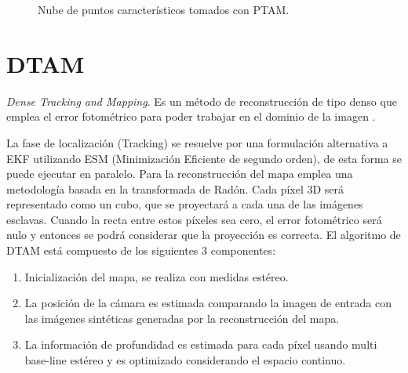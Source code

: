 \begin{figure}[H]
\begin{center}
\end{center}
\caption{Nube de puntos característicos tomados con PTAM.}
\end{figure}



\section{DTAM}
\textit {Dense Tracking and Mapping}. Es un método de reconstrucción de tipo denso que emplea el error fotométrico para poder trabajar en el dominio de la imagen 
\cite{Newcombe2011dtam}.

La fase de localización (Tracking) se resuelve por una formulación alternativa a EKF utilizando ESM (Minimización Eficiente de segundo orden), de esta forma se puede ejecutar en paralelo.
Para la reconstrucción del mapa emplea una metodología basada en la transformada de Radón. Cada píxel 3D será representado como un cubo, que se proyectará a cada una de las imágenes esclavas. Cuando la recta entre estos píxeles sea cero, el error fotométrico será nulo y entonces se podrá considerar que la proyección es correcta.
El algoritmo de DTAM está compuesto de los siguientes 3 componentes:
\begin{enumerate}
\item Inicialización del mapa, se realiza con medidas estéreo.

\item La posición de la cámara es estimada comparando la imagen de entrada con las imágenes sintéticas generadas por la reconstrucción del mapa.

\item La información de profundidad es estimada para cada píxel usando multi base-line estéreo y es optimizado considerando el espacio continuo.
\end{enumerate}


